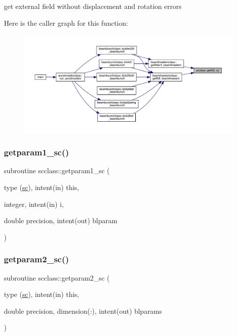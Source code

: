 get external field without displacement and rotation errors 

Here is the caller graph for this function\+:\nopagebreak
\begin{figure}[H]
\begin{center}
\leavevmode
\includegraphics[width=350pt]{namespacescclass_a73840f6e9b85c73425db1f08ab539aa2_icgraph}
\end{center}
\end{figure}
\mbox{\label{namespacescclass_a5f02207aa4bb28b292bf39bd5876c7e2}} 
\subsubsection{\texorpdfstring{getparam1\_sc()}{getparam1\_sc()}}
{\footnotesize\ttfamily subroutine scclass\+::getparam1\+\_\+sc (\begin{DoxyParamCaption}\item[{type (\mbox{\hyperlink{namespacescclass_structscclass_1_1sc}{sc}}), intent(in)}]{this,  }\item[{integer, intent(in)}]{i,  }\item[{double precision, intent(out)}]{blparam }\end{DoxyParamCaption})}

\mbox{\label{namespacescclass_a036860e8ca9dff4cc79e19ec6c55f86a}} 
\subsubsection{\texorpdfstring{getparam2\_sc()}{getparam2\_sc()}}
{\footnotesize\ttfamily subroutine scclass\+::getparam2\+\_\+sc (\begin{DoxyParamCaption}\item[{type (\mbox{\hyperlink{namespacescclass_structscclass_1_1sc}{sc}}), intent(in)}]{this,  }\item[{double precision, dimension(\+:), intent(out)}]{blparams }\end{DoxyParamCaption})}

